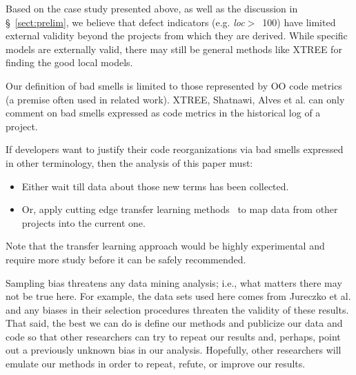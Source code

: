 \documentclass[sigconf, proceedings, 9pt]{acmart}
\newcommand{\tion}[1]{\S~\ref{sect:#1}}
\begin{document}
Based on the case study presented above,
as well as the discussion in \tion{prelim},
we believe that defect indicators (e.g. \mbox{{\em loc}$>$ 100})
have limited external validity beyond the projects from which they are 
derived.
While specific models are externally valid,
there may still be general methods like XTREE for finding the good local 
models.

Our definition of bad smells is limited to those represented by OO code 
metrics (a premise often used in related work).
XTREE, Shatnawi, Alves et al. can  only comment
on bad smells   expressed as code metrics
in the historical log of a project.

If developers want to justify their code reorganizations
via bad smells expressed in other terminology,
then the  analysis of this paper must:
\begin{itemize}
	\item Either wait till
	data about those new
	terms has been collected.
	\item Or, apply cutting edge transfer learning
	methods~\cite{Nam15,Jing15, krishna16} to map data from other projects
	into the current one.
\end{itemize}
Note that the transfer learning approach would
be highly experimental and require more study
before it can be safely recommended.

Sampling bias threatens any data mining analysis; i.e., what matters
there may not be true here. For example, the data sets used here comes 
from 
Jureczko et al. and any biases in their selection procedures
threaten the validity of these results.
That said,
the best we can do is define our methods and publicize our data and code so 
that other researchers can
try to repeat our results and, perhaps, point out a previously unknown bias
in our analysis. Hopefully, other researchers will emulate our methods in
order to repeat, refute, or improve our results.

\balance


\end{document}
